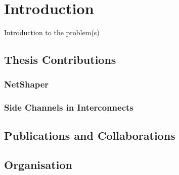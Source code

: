 
\chapter{Introduction}
\label{ch:Introduction}

Introduction to the problem(s)

\section{Thesis Contributions}\label{sec:contributions}
\subsection{NetShaper}\label{sec:netshaper}
\subsection{Side Channels in Interconnects}\label{sec:interconnect-sc-intro}
\section{Publications and Collaborations}\label{sec:collabs}
\section{Organisation}\label{sec:org}
\endinput

Everything here is ignored